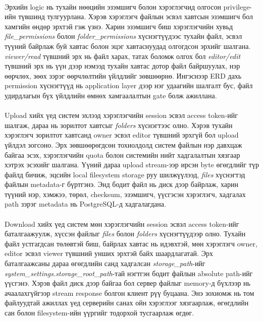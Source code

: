 \paragraph{}
Эрхийн logic нь тухайн нөөцийн эзэмшигч болон хэрэглэгчид олгосон privilege-ийн түвшинд тулгуурлана. Хэрэв хэрэглэгч файлын эсвэл хавтсын эзэмшигч бол хамгийн өндөр эрхтэй гэж үзнэ. Харин эзэмшигч биш хэрэглэгчийн хувьд \textit{file\_permissions} болон \textit{folder\_permissions} хүснэгтүүдээс тухайн файл, эсвэл түүний байрлаж буй хавтас болон эцэг хавтаснуудад олгогдсон эрхийг шалгана. \textit{viewer/read} түвшний эрх нь файл харах, татах боломж олгох бол \textit{editor/edit} түвшний эрх нь үүн дээр нэмээд тухайн хавтас дотор файл байршуулах, нэр өөрчлөх, зөөх зэрэг өөрчлөлтийн үйлдлийг зөвшөөрнө. Ингэснээр ERD дахь permission хүснэгтүүд нь application layer дээр нэг удаагийн шалгалт бус, файл удирдлагын бүх үйлдлийн өмнөх хамгаалалтын gate болж ажиллана.

\paragraph{}
Upload хийх үед систем эхлээд хэрэглэгчийн session эсвэл access token-ийг шалгаж, дараа нь зорилтот хавтсыг \textit{folders} хүснэгтээс олно. Хэрэв тухайн хэрэглэгч зорилтот хавтсанд owner эсвэл editor түвшний эрхгүй бол upload үйлдэл зогсоно. Эрх зөвшөөрөгдсөн тохиолдолд систем файлын нэр давхцаж байгаа эсэх, хэрэглэгчийн quota болон системийн нийт хадгалалтын хязгаар хэтрэх эсэхийг шалгана. Үүний дараа upload stream-ээр ирсэн byte өгөгдлийг түр файлд бичиж, эцсийн local filesystem storage руу шилжүүлээд, \textit{files} хүснэгтэд файлын metadata-г бүртгэнэ. Энд бодит файл нь диск дээр байрлаж, харин түүний нэр, хэмжээ, төрөл, checksum, эзэмшигч, үүсгэсэн хэрэглэгч, хадгалах path зэрэг metadata нь PostgreSQL-д хадгалагдана.

\paragraph{}
Download хийх үед систем мөн хэрэглэгчийн session эсвэл access token-ийг баталгаажуулж, хүссэн файлыг \textit{files} болон \textit{folders} хүснэгтүүдээр олно. Тухайн файл устгагдсан төлөвтэй биш, байрлах хавтас нь идэвхтэй, мөн хэрэглэгч owner, editor эсвэл viewer түвшний унших эрхтэй байх шаардлагатай. Эрх баталгаажсаны дараа өгөгдлийн санд хадгалсан \textit{storage\_path}-ийг \textit{system\_settings.storage\_root\_path}-тай нэгтгэн бодит файлын absolute path-ийг үүсгэнэ. Хэрэв файл диск дээр байгаа бол сервер файлыг memory-д бүхлээр нь ачаалахгүйгээр stream response болгон клиент рүү буцаана. Энэ зохиомж нь том файлуудтай ажиллах үед серверийн санах ойн хэрэглээг хязгаарлаж, өгөгдлийн сан болон filesystem-ийн үүргийг тодорхой тусгаарлаж өгдөг.

